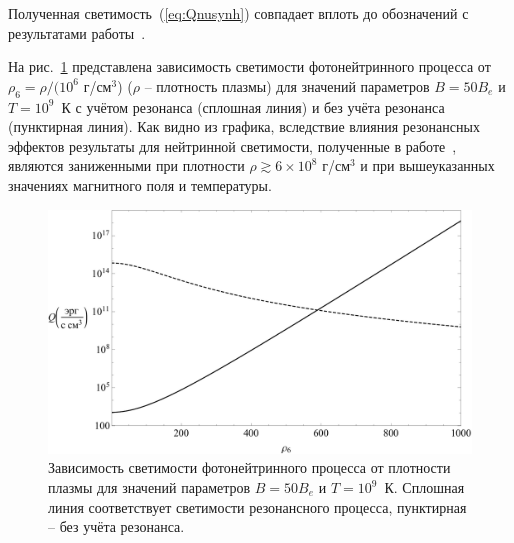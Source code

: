 Полученная светимость~(\ref{eq:Qnusynh}) совпадает вплоть до обозначений с результатами работы~\cite{Yakovlev2000}.

На рис.~\ref{QsyncQphn} представлена зависимость светимости фотонейтринного процесса от $\rho_6 = \rho /(10^6$ г/см$^3$) 
($\rho$ -- плотность плазмы) для значений параметров 
$B=50 B_e$ и $T=10^9$~К с учётом резонанса (сплошная линия) и без учёта резонанса~\cite{RumChMik} (пунктирная линия). Как видно из графика, 
вследствие влияния резонансных эффектов 
результаты для нейтринной светимости, полученные в работе~\cite{%
RumChMik}, 
являются заниженными при плотности $\rho\gtrsim 6\times 10^8$ г/см$^3$ и при вышеуказанных значениях магнитного поля и температуры.

\begin{figure}[h]
\centering
\includegraphics[width=13cm,clip]{Qsyn-Qpn 1.pdf}
\caption{Зависимость светимости фотонейтринного процесса от плотности плазмы для значений параметров 
$B=50 B_e$ и $T=10^9$~К. Сплошная линия соответствует светимости резонансного процесса, пунктирная -- без учёта резонанса.}
\label{QsyncQphn}  
\end{figure}
